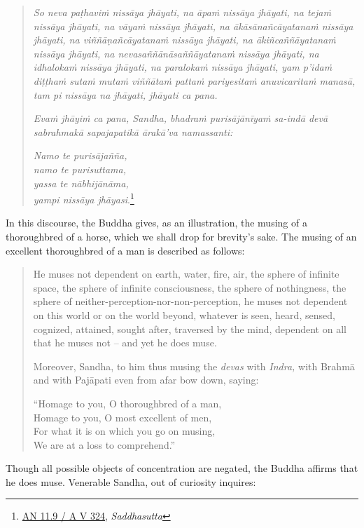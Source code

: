 \begin{quote}
\emph{So neva paṭhaviṁ nissāya jhāyati, na āpaṁ nissāya jhāyati, na tejaṁ nissāya jhāyati, na vāyaṁ nissāya jhāyati, na ākāsānañcāyatanaṁ nissāya jhāyati, na viññāṇañcāyatanaṁ nissāya jhāyati, na ākiñcaññāyatanaṁ nissāya jhāyati, na nevasaññānāsaññāyatanaṁ nissāya jhāyati, na idhalokaṁ nissāya jhāyati, na paralokaṁ nissāya jhāyati, yam p'idaṁ diṭṭhaṁ sutaṁ mutaṁ viññātaṁ pattaṁ pariyesitaṁ anuvicaritaṁ manasā, tam pi nissāya na jhāyati, jhāyati ca pana.}

\emph{Evaṁ jhāyiṁ ca pana, Sandha, bhadraṁ purisājānīyaṁ sa-indā devā sabrahmakā sapajapatikā ārakā'va namassanti:}

\emph{Namo te purisājañña,}\\
\emph{namo te purisuttama,}\\
\emph{yassa te nābhijānāma,}\\
\emph{yampi nissāya jhāyasi}.\footnote{\href{https://suttacentral.net/an11.9/pli/ms}{AN 11.9 / A V 324}, \emph{Saddhasutta}}
\end{quote}

In this discourse, the Buddha gives, as an illustration, the musing of a thoroughbred of a horse, which we shall drop for brevity's sake. The musing of an excellent thoroughbred of a man is described as follows:

\begin{quote}
He muses not dependent on earth, water, fire, air, the sphere of infinite space, the sphere of infinite consciousness, the sphere of nothingness, the sphere of neither-perception-nor-non-perception, he muses not dependent on this world or on the world beyond, whatever is seen, heard, sensed, cognized, attained, sought after, traversed by the mind, dependent on all that he muses not -- and yet he does muse.

Moreover, Sandha, to him thus musing the \emph{devas} with \emph{Indra,} with Brahmā and with Pajāpati even from afar bow down, saying:

``Homage to you, O thoroughbred of a man,\\
Homage to you, O most excellent of men,\\
For what it is on which you go on musing,\\
We are at a loss to comprehend.''
\end{quote}

Though all possible objects of concentration are negated, the Buddha affirms that he does muse. Venerable Sandha, out of curiosity inquires:

